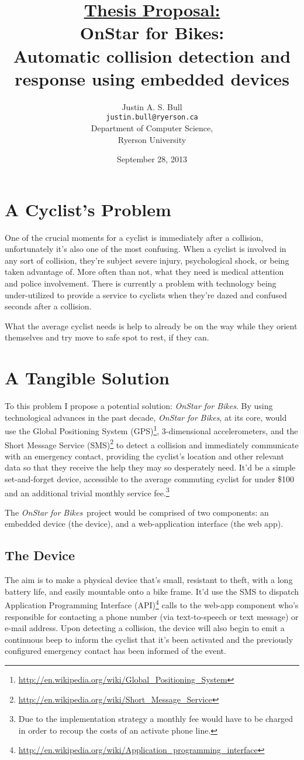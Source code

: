\documentclass[titlepage]{article}
\title{\underline{Thesis Proposal:}\\
	\vspace{12pt}
	OnStar for Bikes:\\
	Automatic collision detection and response using embedded devices}
\author{Justin A. S. Bull\\
	\texttt{justin.bull@ryerson.ca}\\
	Department of Computer Science,\\
	Ryerson University\\}
\date{September 28, 2013}
\newcommand{\onstar}{{\em OnStar for Bikes}}
\begin{document}
\maketitle

\section{A Cyclist's Problem}
One of the crucial moments for a cyclist is immediately after a collision, unfortunately it's also one of the most confusing. When a cyclist is involved in any sort of collision, they're subject severe injury, psychological shock, or being taken advantage of. More often than not, what they need is medical attention and police involvement. There is currently a problem with technology being under-utilized to provide a service to cyclists when they're dazed and confused seconds after a collision.

What the average cyclist needs is help to already be on the way while they orient themselves and try move to safe spot to rest, if they can.

\section{A Tangible Solution}
To this problem I propose a potential solution: \onstar. By using technological advances in the past decade, \onstar, at its core, would use the Global Positioning System (GPS)\footnote{\url{http://en.wikipedia.org/wiki/Global_Positioning_System}}, 3-dimensional accelerometers, and the Short Message Service (SMS)\footnote{\url{http://en.wikipedia.org/wiki/Short_Message_Service}} to detect a collision and immediately communicate with an emergency contact, providing the cyclist's location and other relevant data so that they receive the help they may so desperately need. It'd be a simple set-and-forget device, accessible to the average commuting cyclist for under \$100 and an additional trivial monthly service fee.\footnote{Due to the implementation strategy a monthly fee would have to be charged in order to recoup the costs of an activate phone line.}

The \onstar\ project would be comprised of two components: an embedded device (the device), and a web-application interface (the web app).

\subsection{The Device}
The aim is to make a physical device that's small, resistant to theft, with a long battery life, and easily mountable onto a bike frame. It'd use the SMS to dispatch Application Programming Interface (API)\footnote{\url{http://en.wikipedia.org/wiki/Application_programming_interface}} calls to the web-app component who's responsible for contacting a phone number (via text-to-speech or text message) or e-mail address. Upon detecting a collision, the device will also begin to emit a continuous beep to inform the cyclist that it's been activated and the previously configured emergency contact has been informed of the event.
\end{document}
